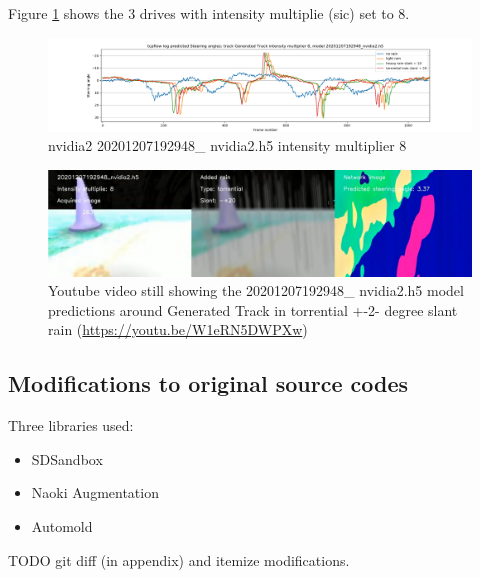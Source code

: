 Figure \ref{fig:sa_GeneratedTrackintensitymultiplier8_20201207192948_nvidia2} shows the 3 drives with intensity multiplie (sic) set to 8.
\begin{figure}[ht]
 \centering 
 \includegraphics[width=\textwidth]{Figures/sa_GeneratedTrackintensitymultiplier8_20201207192948_nvidia2.h5}
 \caption{nvidia2 20201207192948\_ nvidia2.h5 intensity multiplier 8}
 \label{fig:sa_GeneratedTrackintensitymultiplier8_20201207192948_nvidia2} 
\end{figure}

\begin{figure}[ht]
 \centering 
 \includegraphics[width=\textwidth]{Figures/youtube20201207192948_nvidia2torrential20mult_8_h5.png}
 \caption{Youtube video still showing the 20201207192948\_ nvidia2.h5 model predictions around Generated Track in torrential +-2- degree slant rain (\url{https://youtu.be/W1eRN5DWPXw})}
 \label{fig:youtube20201207192948_nvidia2torrential20mult_8_h5} 
\end{figure}




\subsection{Modifications to original source codes}
Three libraries used:
\begin{itemize}
    \item SDSandbox
    \item Naoki Augmentation
    \item Automold
\end{itemize}
TODO git diff (in appendix) and itemize modifications.
    
